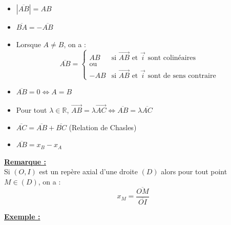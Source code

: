 \documentclass[12pt,a4paper]{article}
\begin{document}
\begin{itemize}
    \item[\color{red} i)] $|\overline{AB}| = AB$
    \item[\color{red} ii)] $\overline{BA} = -\overline{AB}$
    \item[\color{red} iii)] Lorsque $A \neq B$, on a :
    \[ \overline{AB} = \begin{cases} AB & \text{si } \overrightarrow{AB} \text{ et } \vec{i} \text{ sont colinéaires} \\ \text{ou} \\ -AB & \text{si } \overrightarrow{AB} \text{ et } \vec{i} \text{ sont de sens contraire} \end{cases} \]
    \item[\color{red} iv)] $\overline{AB} = 0 \iff A = B$
    \item[\color{red} v)] Pour tout $\lambda \in \mathbb{R}$, $\overrightarrow{AB} = \lambda \overrightarrow{AC} \iff \overline{AB} = \lambda \overline{AC}$
    \item[\color{red} vi)] $\overline{AC} = \overline{AB} + \overline{BC}$ (Relation de Chasles)
    \item[\color{red} vii)] $\overline{AB} = x_B - x_A$
\end{itemize}

\noindent \underline{\textbf{\color{red}Remarque :}} \\
Si $(O, I)$ est un repère axial d'une droite $(D)$ alors pour tout point $M \in (D)$, on a :
\[ x_M = \frac{\overline{OM}}{\overline{OI}} \]

\noindent \underline{\textbf{Exemple :}}

\begin{center}
\end{center}
\end{document}
